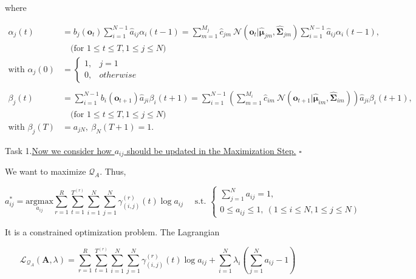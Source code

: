 \documentclass{article}
\newcommand{\whiteqed}{\hfill $\square$\par}
\begin{document}
    where 
    
    \vspace{-3em}
    \begin{align*}
        \alpha_j(t)&=b_j(\mathbf{o}_t)\sum_{i=1}^{N-1}\hat{a}_{ij}\alpha_i(t-1) =\sum_{m=1}^{M_j}\hat{c}_{jm}\ \mathcal{N}(\mathbf{o}_t|\boldsymbol{\hat{\mu}}_{jm},\boldsymbol{\hat{\Sigma}}_{jm})\sum_{i=1}^{N-1}\hat{a}_{ij}\alpha_i(t-1),\\
        &\quad\text{(for }1\le t\le T,1\le j\le N) \\
        \text{with }\alpha_j(0)&=\left\{\begin{array}{ll}
            1, & j=1 \\
            0, & otherwise
        \end{array}\right. \\ \\
        \beta_j(t) &= \sum_{i=1}^{N-1}b_i(\mathbf{o}_{t+1})\hat{a}_{ji}\beta_i(t+1)=\sum_{i=1}^{N-1}\left(\sum_{m=1}^{M_i}\hat{c}_{im}\ \mathcal{N}(\mathbf{o}_{t+1}|\boldsymbol{\hat{\mu}}_{im},\boldsymbol{\hat{\Sigma}}_{im})\right)\hat{a}_{ji}\beta_i(t+1),\\
        &\quad\text{(for }1\le t\le T,1\le j\le N)\\
        \text{with }\beta_j(T)&=a_{jN},\ \beta_N(T+1)=1.
    \end{align*}
    
    \vspace{2em}
    \hspace{-4.5em} Task 1.\quad\underline{Now we consider how $a_{ij}$ should be updated in the Maximization Step.} \whiteqed
    
    We want to maximize $\mathcal{Q}_A$. Thus,
    
    \vspace{-1.5em}
    $$ a^*_{ij} = \underset{a_{ij}}{\mathrm{argmax}}\sum_{r=1}^R\sum_{t=1}^{T^{(r)}}\sum_{i=1}^N\sum_{j=1}^N\gamma^{(r)}_{(i,j)}(t)\log a_{ij}\quad\text{ s.t. } \left\{\begin{array}{l}
         \sum_{j=1}^Na_{ij}=1, \\
         0\le a_{ij}\le 1,\ (1\le i\le N,1\le j\le N)
    \end{array}\right. $$
    
    It is a constrained optimization problem. The Lagrangian
    
    \vspace{-1em}
    $$\mathcal{L}_{\mathcal{Q}_A}(\boldsymbol{A},\lambda)=\sum_{r=1}^R\sum_{t=1}^{T^{(r)}}\sum_{i=1}^N\sum_{j=1}^N\gamma^{(r)}_{(i,j)}(t)\log a_{ij}+ \sum_{i=1}^N\lambda_i\left(\sum_{j=1}^Na_{ij}-1\right)$$
    
\end{document}
